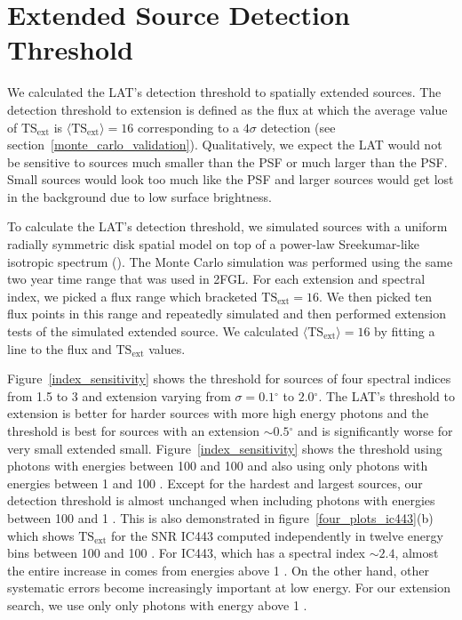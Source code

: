 \documentclass[12pt,preprint]{aastex}
\newcommand{\mev}{\text{MeV}\xspace}
\newcommand{\gev}{\text{GeV}\xspace}
\newcommand{\tsext}{{\ensuremath{\text{TS}_{\text{ext}}}}\xspace}
\newcommand{\ts}{\text{TS}\xspace}
\renewcommand{\deg}{\ensuremath{^\circ}\xspace}
\renewcommand{\approx}{\sim\!\xspace}
\begin{document}
\section{Extended Source Detection Threshold}\label{extension_sensitivity}

We calculated the LAT's detection threshold to spatially
extended sources. The detection threshold to extension is
defined as the flux at which the average value of $\tsext$ is
$\langle\tsext\rangle=16$ corresponding to a $4\sigma$ detection (see
section~\ref{monte_carlo_validation}).  Qualitatively, we expect the LAT
would not be sensitive to sources much smaller than the PSF or much larger
than the PSF.  Small sources would look too much like the PSF and larger
sources would get lost in the background due to low surface brightness.

To calculate the LAT's detection threshold, we simulated sources with
a uniform radially symmetric disk spatial model on top of a power-law
Sreekumar-like isotropic spectrum (\cite{sreekumar_isotropic}).  The Monte
Carlo simulation was performed using the same two year time range that
was used in 2FGL.  For each extension and spectral index, we picked a
flux range which bracketed $\tsext=16$. We then picked ten flux points in
this range and repeatedly simulated and then performed extension tests of
the simulated extended source.  We calculated $\langle\tsext\rangle=16$
by fitting a line to the flux and $\tsext$ values.

Figure~\ref{index_sensitivity} shows the threshold for sources of four
spectral indices from 1.5 to 3 and extension varying from $\sigma=0.1\deg$
to $2.0\deg$.  The LAT's threshold to extension
is better for harder sources with more high energy photons and
the threshold is best for sources with an extension 
$\approx0.5\deg$ and is significantly worse for very small extended small.
Figure~\ref{index_sensitivity} shows the threshold using photons with
energies between 100 \mev and 100 \gev and also using only photons
with energies between 1 \gev and 100 \gev.  Except for the hardest
and largest sources, our detection threshold is almost unchanged when
including photons with energies between 100 \mev and 1 \gev.  This is also
demonstrated in figure~\ref{four_plots_ic443}(b) which shows \tsext for the
SNR IC443 computed independently in twelve energy bins between 100 \mev and
100 \gev. For IC443, which has a spectral index $\approx2.4$, almost the entire
increase in \ts comes from energies above 1 \gev.  On the other hand,
other systematic errors become increasingly important at low energy. For
our extension search, we use only only photons with energy above 1 \gev.
\end{document}
